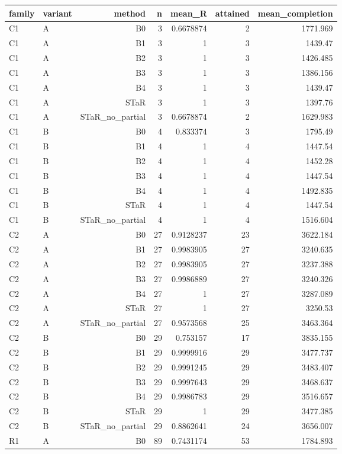 \begin{longtable}{llrrrrr}
\hline
family & variant & method & n & mean\_R & attained & mean\_completion \\
\hline
C1 & A & B0 & 3 & 0.6678874 & 2 & 1771.969 \\
C1 & A & B1 & 3 & 1 & 3 & 1439.47 \\
C1 & A & B2 & 3 & 1 & 3 & 1426.485 \\
C1 & A & B3 & 3 & 1 & 3 & 1386.156 \\
C1 & A & B4 & 3 & 1 & 3 & 1439.47 \\
C1 & A & STaR & 3 & 1 & 3 & 1397.76 \\
C1 & A & STaR\_no\_partial & 3 & 0.6678874 & 2 & 1629.983 \\
C1 & B & B0 & 4 & 0.833374 & 3 & 1795.49 \\
C1 & B & B1 & 4 & 1 & 4 & 1447.54 \\
C1 & B & B2 & 4 & 1 & 4 & 1452.28 \\
C1 & B & B3 & 4 & 1 & 4 & 1447.54 \\
C1 & B & B4 & 4 & 1 & 4 & 1492.835 \\
C1 & B & STaR & 4 & 1 & 4 & 1447.54 \\
C1 & B & STaR\_no\_partial & 4 & 1 & 4 & 1516.604 \\
C2 & A & B0 & 27 & 0.9128237 & 23 & 3622.184 \\
C2 & A & B1 & 27 & 0.9983905 & 27 & 3240.635 \\
C2 & A & B2 & 27 & 0.9983905 & 27 & 3237.388 \\
C2 & A & B3 & 27 & 0.9986889 & 27 & 3240.326 \\
C2 & A & B4 & 27 & 1 & 27 & 3287.089 \\
C2 & A & STaR & 27 & 1 & 27 & 3250.53 \\
C2 & A & STaR\_no\_partial & 27 & 0.9573568 & 25 & 3463.364 \\
C2 & B & B0 & 29 & 0.753157 & 17 & 3835.155 \\
C2 & B & B1 & 29 & 0.9999916 & 29 & 3477.737 \\
C2 & B & B2 & 29 & 0.9991245 & 29 & 3483.407 \\
C2 & B & B3 & 29 & 0.9997643 & 29 & 3468.637 \\
C2 & B & B4 & 29 & 0.9986783 & 29 & 3516.657 \\
C2 & B & STaR & 29 & 1 & 29 & 3477.385 \\
C2 & B & STaR\_no\_partial & 29 & 0.8862641 & 24 & 3656.007 \\
R1 & A & B0 & 89 & 0.7431174 & 53 & 1784.893 \\

\end{longtable}
